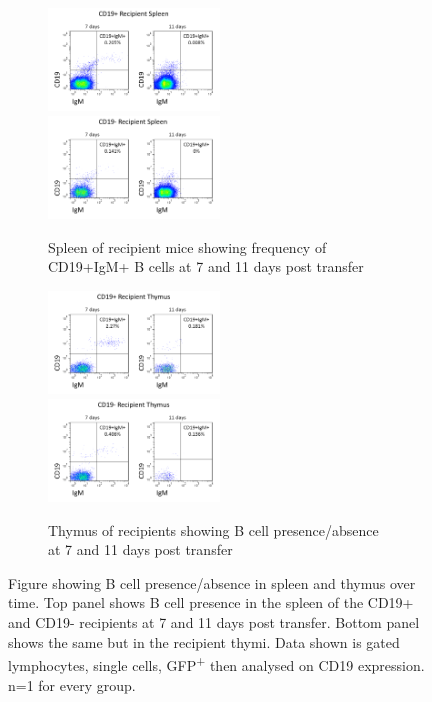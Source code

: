 \begin{figure}
	\begin{subfigure}{\textwidth}
	\includegraphics[width=0.5\textwidth]{Figures/CD19posrecipspleen.png}
	\includegraphics[width=0.5\textwidth]{Figures/CD19negrecipspleen.png}
	\caption{Spleen of recipient mice showing frequency of CD19+IgM+ B cells at 7 and 11 days post transfer}
	\end{subfigure}
	\begin{subfigure}{\textwidth}
	\includegraphics[width=0.5\textwidth]{Figures/CD19posrecipthy.png}
	\includegraphics[width=0.5\textwidth]{Figures/CD19negrecipthy.png}
	\caption{Thymus of recipients showing B cell presence/absence at 7 and 11 days post transfer}
	\end{subfigure}
\caption[Donor B cells are found in the spleen of recipient mice at 4 days post transplant]{Figure showing B cell presence/absence in spleen and thymus over time.
Top panel shows B cell presence in the spleen of the CD19+ and CD19- recipients at 7 and 11 days post transfer.
Bottom panel shows the same but in the recipient thymi.
Data shown is gated lymphocytes, single cells, GFP\textsuperscript{+} then analysed on CD19 expression.
n=1 for every group.}
\label{fig:Transfer}
\end{figure}

